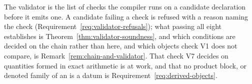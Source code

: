 
The validator is the list of checks the compiler runs on a candidate
declaration before it emits one. A candidate failing a check is refused with a
reason naming the check (Requirement~\ref{req:validator-refusals}); what
passing all eight establishes is Theorem~\ref{thm:validator-soundness}, and which conditions
are decided on the chain rather than here, and which objects check V1 does
not compare, is Remark~\ref{rem:chain-and-validator}. That check V7 decides
on quantities formed in exact arithmetic is
 at work, and that no product block,
 or denoted family of an  is a
datum is
Requirement~\ref{req:derived-objects}.


